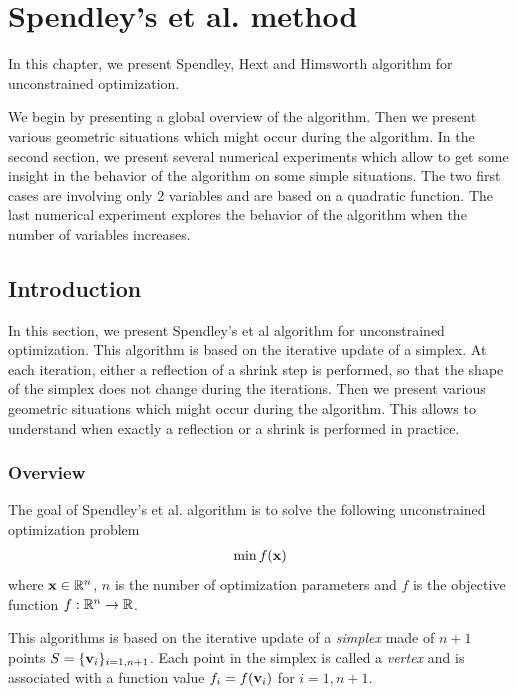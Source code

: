 \chapter{Spendley's et al. method}

In this chapter, we present Spendley, Hext and Himsworth algorithm \cite{Spendley1962} for 
unconstrained optimization.

We begin by presenting a global overview of the algorithm. 
Then we present various geometric situations which might occur
during the algorithm. In the second section, we present several 
numerical experiments which allow to get some insight in the behavior 
of the algorithm on some simple situations. The two first cases 
are involving only 2 variables and are based on a quadratic function.
The last numerical experiment explores the behavior of the algorithm 
when the number of variables increases.

\section{Introduction}

In this section, we present Spendley's et al algorithm for unconstrained optimization.
This algorithm is based on the iterative update of a simplex. 
At each iteration, either a reflection of a shrink step is performed, so that
the shape of the simplex does not change during the iterations.
Then we present various geometric situations which might occur
during the algorithm. This allows to understand when exactly a reflection 
or a shrink is performed in practice.

\subsection{Overview}

The goal of Spendley's et al. algorithm is to solve the 
following unconstrained optimization problem
\begin{eqnarray}
\min f(\mathbf{x})
\end{eqnarray}
where $\mathbf{x}\in \mathbb{R}^n$, $n$ is the number of optimization parameters and $f$ is the objective 
function $f:\mathbb{R}^n\rightarrow \mathbb{R}$.

This algorithms is based on the iterative update of 
a \emph{simplex} made of $n+1$ points $S=\{\mathbf{v}_i\}_{i=1,n+1}$. Each point 
in the simplex is called a \emph{vertex} and is associated with 
a function value $f_i=f(\mathbf{v}_i)$ for $i=1,n+1$.

